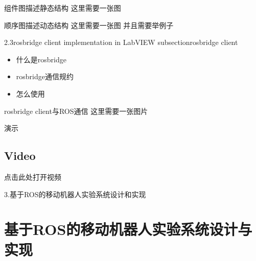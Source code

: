 \documentclass{beamer}
\begin{document}
\begin{frame}[t]{组件图描述静态结构}
    这里需要一张图
\end{frame}
\begin{frame}[t]{顺序图描述动态结构}
    这里需要一张图
    并且需要举例子
\end{frame}
\begin{frame}[t]{2.3rosbridge client implementation in LabVIEW}
    subsection{rosbridge client}
    \begin{itemize}
        \item 什么是rosbridge
        \item rosbridge通信规约
        \item 怎么使用
    \end{itemize}
\end{frame}
\begin{frame}[t]{rosbridge client与ROS通信}
    这里需要一张图片
\end{frame}
\begin{frame}[t]{演示}
    \subsection{Video}
    点击此处打开视频
\end{frame}
\begin{frame}[t]{3.基于ROS的移动机器人实验系统设计和实现}
    \section{基于ROS的移动机器人实验系统设计与实现}
\end{frame}
\end{document}
